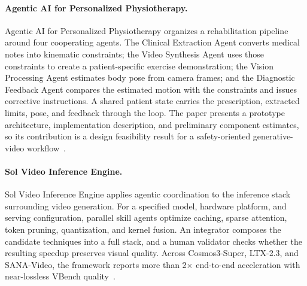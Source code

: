\paragraph{Agentic AI for Personalized Physiotherapy.}
Agentic AI for Personalized Physiotherapy organizes a rehabilitation pipeline around four cooperating agents. The Clinical Extraction Agent converts medical notes into kinematic constraints; the Video Synthesis Agent uses those constraints to create a patient-specific exercise demonstration; the Vision Processing Agent estimates body pose from camera frames; and the Diagnostic Feedback Agent compares the estimated motion with the constraints and issues corrective instructions. A shared patient state carries the prescription, extracted limits, pose, and feedback through the loop. The paper presents a prototype architecture, implementation description, and preliminary component estimates, so its contribution is a design feasibility result for a safety-oriented generative-video workflow~\cite{avg260421154}.

\paragraph{Sol Video Inference Engine.}
Sol Video Inference Engine applies agentic coordination to the inference stack surrounding video generation. For a specified model, hardware platform, and serving configuration, parallel skill agents optimize caching, sparse attention, token pruning, quantization, and kernel fusion. An integrator composes the candidate techniques into a full stack, and a human validator checks whether the resulting speedup preserves visual quality. Across Cosmos3-Super, LTX-2.3, and SANA-Video, the framework reports more than 2$\times$ end-to-end acceleration with near-lossless VBench quality~\cite{avg260623743}.
